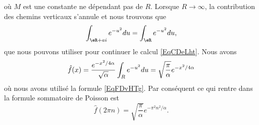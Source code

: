 \begin{example}
\begin{equation}
    \end{equation}
    où \( M\) est une constante ne dépendant pas de \( R\). Lorsque \( R\to \infty\), la contribution des chemins verticaux s'annule et nous trouvons que
    \begin{equation}    \label{EqjrNxLr}
        \int_{\eR+ai} e^{-u^2}du=\int_{\eR} e^{-u^2}du,
    \end{equation}
    que nous pouvons utiliser pour continuer le calcul \eqref{EqCDeLht}. Nous avons
    \begin{equation}
        \hat f(x)= \frac{ e^{-x^2/4\alpha}}{\sqrt{\alpha}}\int_{R} e^{-u^2}du\\
            =\sqrt{\frac{ \pi }{ \alpha }} e^{-x^2/4\alpha}
    \end{equation}
    où nous avons utilisé la formule \eqref{EqFDvHTg}. Par conséquent ce qui rentre dans la formule sommatoire de Poisson est
    \begin{equation}
        \hat f(2\pi n)=\sqrt{\frac{ \pi }{ \alpha }} e^{-\pi^2 n^2/\alpha}.
    \end{equation}
\end{example}

